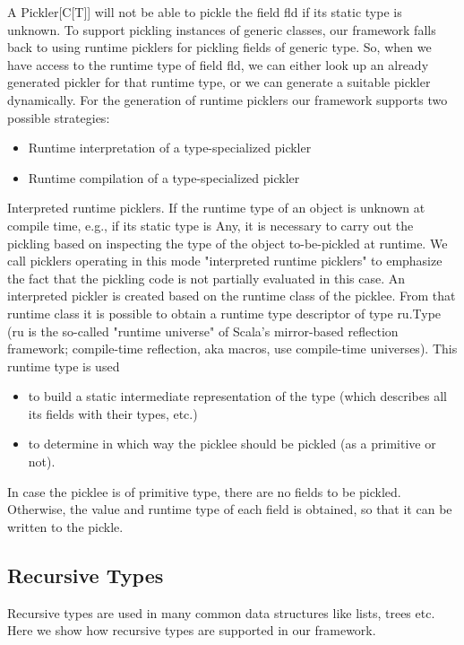 \documentclass[preprint,10pt]{sigplanconf}
\theoremstyle{definition}
\begin{document}
A Pickler[C[T]] will not be able to pickle the field fld if its static type is unknown. To support pickling instances of generic classes, our framework falls back to using runtime picklers for pickling fields of generic type. So, when we have access to the runtime type of field fld, we can either look up an already generated pickler for that runtime type, or we can generate a suitable pickler dynamically. For the generation of runtime picklers our framework supports two possible strategies:

\begin{itemize}
\item Runtime interpretation of a type-specialized pickler
\item Runtime compilation of a type-specialized pickler
\end{itemize}

Interpreted runtime picklers. If the runtime type of an object is unknown at compile time, e.g., if its static type is Any, it is necessary to carry out the pickling based on inspecting the type of the object to-be-pickled at runtime. We call picklers operating in this mode "interpreted runtime picklers" to emphasize the fact that the pickling code is not partially evaluated in this case. An interpreted pickler is created based on the runtime class of the picklee. From that runtime class it is possible to obtain a runtime type descriptor of type ru.Type (ru is the so-called "runtime universe" of Scala's mirror-based reflection framework; compile-time reflection, aka macros, use compile-time universes). This runtime type is used

\begin{itemize}
\item to build a static intermediate representation of the type (which describes all its fields with their types, etc.)
\item to determine in which way the picklee should be pickled (as a primitive or not).
\end{itemize}

In case the picklee is of primitive type, there are no fields to be pickled. Otherwise, the value and runtime type of each field is obtained, so that it can be written to the pickle.

\subsection{Recursive Types}

Recursive types are used in many common data structures like lists, trees etc. Here we show how recursive types are supported in our framework.
\end{document}

